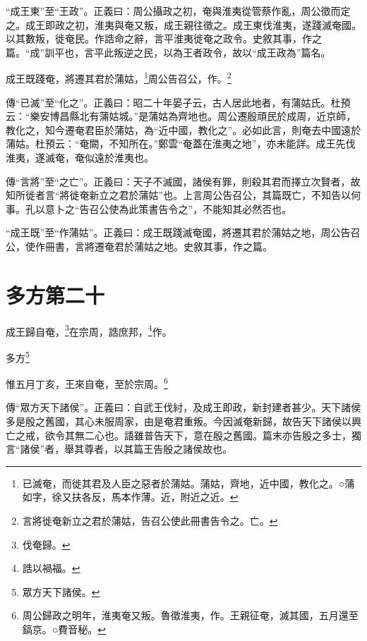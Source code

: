 {\noindent\shu{}\fzkt “成王東”至“王政”。正義曰：周公攝政之初，奄與淮夷從管蔡作亂，周公徵而定之。成王即政之初，淮夷與奄又叛，成王親往徵之。成王東伐淮夷，遂踐滅奄國。以其數叛，徙奄民。作誥命之辭，言平淮夷徙奄之政令。史敘其事，作之篇。“成”訓平也，言平此叛逆之民，以為王者政令，故以“成王政為”篇名。 \par}

成王既踐奄，將遷其君於蒲姑，\footnote{已滅奄，而徙其君及人臣之惡者於蒲姑。蒲姑，齊地，近中國，教化之。○蒲如字，徐又扶各反，馬本作薄。近，附近之近。}周公告召公，作。\footnote{言將徙奄新立之君於蒲姑，告召公使此冊書告令之。亡。}


{\noindent\zhuan{}\fzbyks 傳“已滅”至“化之”。正義曰：昭二十年晏子云，古人居此地者，有蒲姑氏。杜預云：“樂安博昌縣北有蒲姑城。”是蒲姑為齊地也。周公遷殷頑民於成周，近京師，教化之，知今遷奄君臣於蒲姑，為“近中國，教化之”。必如此言，則奄去中國遠於蒲姑。杜預云：“奄闕，不知所在。”鄭雲“奄蓋在淮夷之地”，亦未能詳。成王先伐淮夷，遂滅奄，奄似遠於淮夷也。 \par}

{\noindent\zhuan{}\fzbyks 傳“言將”至“之亡”。正義曰：天子不滅國，諸侯有罪，則殺其君而擇立次賢者，故知所徙者言“將徙奄新立之君於蒲姑”也。上言周公告召公，其篇既亡，不知告以何事。孔以意卜之“告召公使為此策書告令之”，不能知其必然否也。 \par}

{\noindent\shu{}\fzkt “成王既”至“作蒲姑”。正義曰：成王既踐滅奄國，將遷其君於蒲姑之地，周公告召公，使作冊書，言將遷奄君於蒲姑之地。史敘其事，作之篇。 \par}

\section{多方第二十}


成王歸自奄，\footnote{伐奄歸。}在宗周，誥庶邦，\footnote{誥以禍福。}作。

多方\footnote{眾方天下諸侯。}

惟五月丁亥，王來自奄，至於宗周。\footnote{周公歸政之明年，淮夷奄又叛。魯徵淮夷，作。王親征奄，滅其國，五月還至鎬京。○費音秘。}

{\noindent\zhuan{}\fzbyks 傳“眾方天下諸侯”。正義曰：自武王伐紂，及成王即政，新封建者甚少。天下諸侯多是殷之舊國，其心未服周家，由是奄君重叛。今因滅奄新歸，故告天下諸侯以興亡之戒，欲令其無二心也。語雖普告天下，意在殷之舊國。篇末亦告殷之多士，獨言“諸侯”者，舉其尊者，以其篇王告殷之諸侯故也。 \par}

